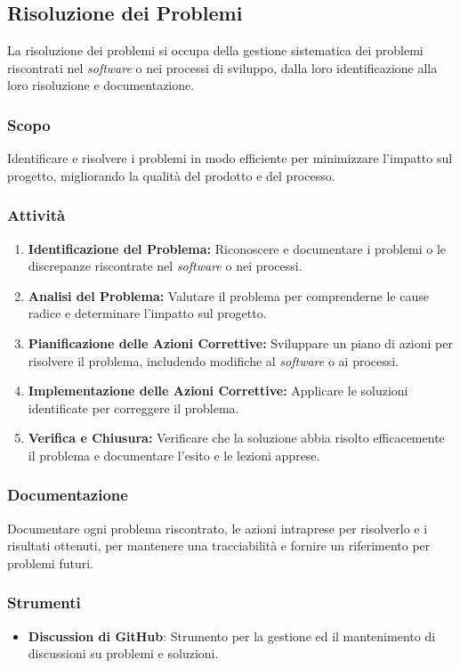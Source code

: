 \subsection{Risoluzione dei Problemi}

La risoluzione dei problemi si occupa della gestione sistematica dei problemi
riscontrati nel \textit{software} o nei processi di sviluppo, dalla loro
identificazione alla loro risoluzione e documentazione.

\subsubsection{Scopo}
Identificare e risolvere i problemi in modo efficiente per minimizzare l'impatto
sul progetto, migliorando la qualità del prodotto e del processo.

\subsubsection{Attività}
\begin{enumerate}
	\item \textbf{Identificazione del Problema:} Riconoscere e documentare i
	      problemi o le discrepanze riscontrate nel \textit{software} o nei
	      processi.
	\item \textbf{Analisi del Problema:} Valutare il problema per comprenderne
	      le cause radice e determinare l'impatto sul progetto.
	\item \textbf{Pianificazione delle Azioni Correttive:} Sviluppare un piano
	      di azioni per risolvere il problema, includendo modifiche al
	      \textit{software} o ai processi.
	\item \textbf{Implementazione delle Azioni Correttive:} Applicare le
	      soluzioni identificate per correggere il problema.
	\item \textbf{Verifica e Chiusura:} Verificare che la soluzione abbia
	      risolto efficacemente il problema e documentare l'esito e le lezioni
	      apprese.
\end{enumerate}

\subsubsection{Documentazione}
Documentare ogni problema riscontrato, le azioni intraprese per risolverlo e i
risultati ottenuti, per mantenere una tracciabilità e fornire un riferimento
per problemi futuri.

\subsubsection{Strumenti}
\begin{itemize}
	\item \textbf{Discussion di GitHub\g}: Strumento per la gestione ed
	      il mantenimento di discussioni su problemi e soluzioni.
\end{itemize}
